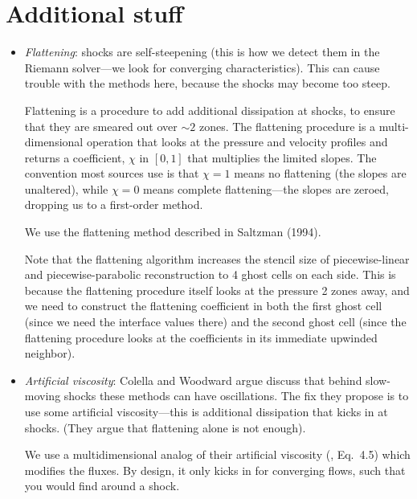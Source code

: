 \documentclass[11pt]{article}
\begin{document}
\section{Additional stuff}

\begin{itemize}

\item {\em Flattening}: shocks are self-steepening (this is how we
  detect them in the Riemann solver---we look for converging characteristics).
  This can cause trouble with the methods here, because the shocks may become
  too steep.  

  Flattening is a procedure to add additional dissipation at shocks,
  to ensure that they are smeared out over $\sim 2$ zones.  The
  flattening procedure is a multi-dimensional operation that looks at
  the pressure and velocity profiles and returns a coefficient, $\chi$
  in $[0,1]$ that multiplies the limited slopes.  The convention most
  sources use is that $\chi = 1$ means no flattening (the slopes are
  unaltered), while $\chi = 0$ means complete flattening---the slopes
  are zeroed, dropping us to a first-order method.

  We use the flattening method described in Saltzman (1994).

  Note that the flattening algorithm increases the stencil size of
  piecewise-linear and piecewise-parabolic reconstruction to 4 ghost cells
  on each side.  This is because the flattening procedure itself looks
  at the pressure 2 zones away, and we need to construct the flattening
  coefficient in both the first ghost cell (since we need the interface
  values there) and the second ghost cell (since the flattening procedure
  looks at the coefficients in its immediate upwinded neighbor).

\item {\em Artificial viscosity}: Colella and Woodward argue discuss
  that behind slow-moving shocks these methods can have oscillations.
  The fix they propose is to use some artificial viscosity---this is
  additional dissipation that kicks in at shocks.  (They argue that
  flattening alone is not enough).  

  We use a multidimensional analog of their artificial viscosity
  (\cite{colellawoodward:1984}, Eq.\ 4.5) which modifies the fluxes.
  By design, it only kicks in for converging flows, such that you
  would find around a shock.


\end{itemize}
\end{document}
